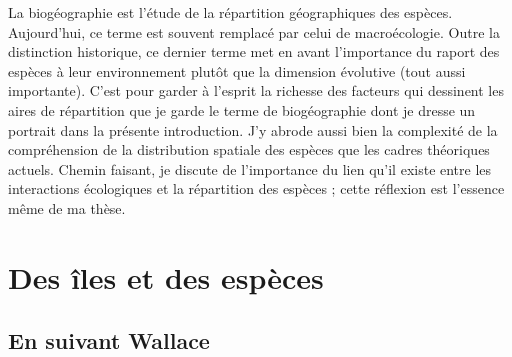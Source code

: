 La biogéographie est l'étude de la répartition géographiques des
espèces. Aujourd'hui, ce terme est souvent remplacé par celui de
macroécologie. Outre la distinction historique, ce dernier terme met en
avant l'importance du raport des espèces à leur environnement plutôt que
la dimension évolutive (tout aussi importante). C'est pour garder à
l'esprit la richesse des facteurs qui dessinent les aires de répartition
que je garde le terme de biogéographie dont je dresse un portrait dans
la présente introduction. J'y abrode aussi bien la complexité de la
compréhension de la distribution spatiale des espèces que les cadres
théoriques actuels. Chemin faisant, je discute de l'importance du lien
qu'il existe entre les interactions écologiques et la répartition des
espèces ; cette réflexion est l'essence même de ma thèse.

\section*{Des îles et des espèces}\label{des-uxeeles-et-des-espuxe8ces}

\subsection*{En suivant Wallace}\label{en-suivant-wallace}

